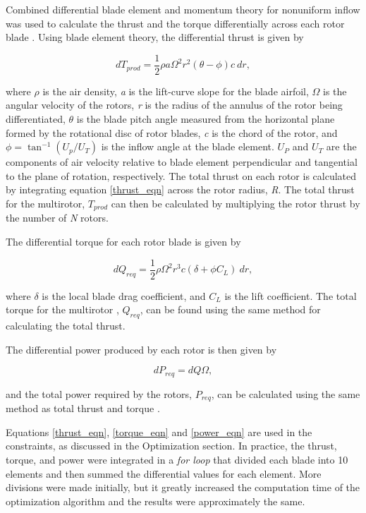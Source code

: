\documentclass[letterpaper, 10 pt, conference]{ieeeconf}  %
\begin{document}
Combined differential blade element and momentum theory for nonuniform inflow was used to calculate the thrust and the torque differentially across each rotor blade \cite{bramwell2001bramwell}. Using blade element theory, the differential thrust is given by

\begin{equation}
	dT_{prod} = \frac{1}{2} \rho a \Omega^2 r^2 (\theta - \phi) c \  dr,
	\label{thrust_eqn}
\end{equation}

where $\rho$ is the air density, \textit{a} is the lift-curve slope for the blade airfoil, $\Omega$ is the angular velocity of the rotors, \textit{r} is the radius of the annulus of the rotor being differentiated, $\theta$ is the blade pitch angle measured from the horizontal plane formed by the rotational disc of rotor blades, \textit{c} is the chord of the rotor, and $\phi = \tan^{-1}(U_p/U_T) $ is the inflow angle at the blade element. $U_P$ and $U_T$ are the components of air velocity relative to blade element perpendicular and tangential to the plane of rotation, respectively. The total thrust on each rotor is calculated by integrating equation \ref{thrust_eqn} across the rotor radius, \textit{R}. The total thrust for the multirotor, $T_{prod}$ can then be calculated by multiplying the rotor thrust by the number of \textit{N} rotors. 

The differential torque for each rotor blade is given by

\begin{equation}
	dQ_{req} = \frac{1}{2} \rho \Omega^2 r^3 c (\delta + \phi C_L) \ dr,
	\label{torque_eqn}
\end{equation}

where $\delta$ is the local blade drag coefficient, and $C_L$ is the lift coefficient. The total torque for the multirotor , $Q_{req}$, can be found using the same method for calculating the total thrust. 

The differential power produced by each rotor is then given by 

\begin{equation}
	dP_{req} = dQ\Omega,
	\label{power_eqn}
\end{equation}

and the total power required by the rotors, $P_{req}$, can be calculated using the same method as total thrust and torque \cite{venkatesan2014fundamentals}. 

Equations \ref{thrust_eqn}, \ref{torque_eqn} and \ref{power_eqn} are used in the constraints, as discussed in the Optimization section. In practice, the thrust, torque, and power were integrated in a \textit{for loop} that divided each blade into 10 elements and then summed the differential values for each element. More divisions were made initially, but it greatly increased the computation time of the optimization algorithm and the results were approximately the same. 
\end{document}
